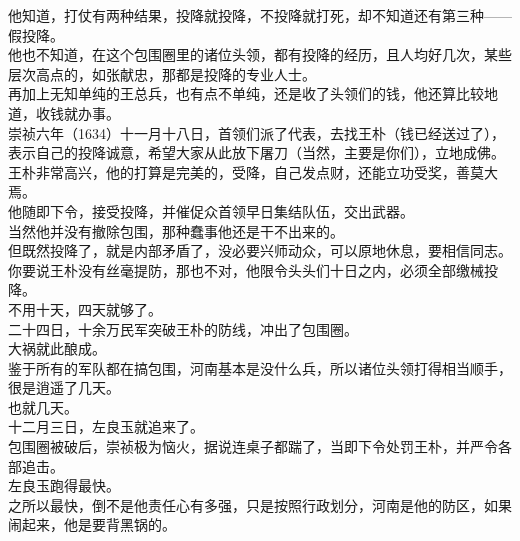 \begin{multicols}{\theparacolNo}
他知道，打仗有两种结果，投降就投降，不投降就打死，却不知道还有第三种——假投降。\\

他也不知道，在这个包围圈里的诸位头领，都有投降的经历，且人均好几次，某些层次高点的，如张献忠，那都是投降的专业人士。\\

再加上无知单纯的王总兵，也有点不单纯，还是收了头领们的钱，他还算比较地道，收钱就办事。\\

崇祯六年（1634）十一月十八日，首领们派了代表，去找王朴（钱已经送过了），表示自己的投降诚意，希望大家从此放下屠刀（当然，主要是你们），立地成佛。\\

王朴非常高兴，他的打算是完美的，受降，自己发点财，还能立功受奖，善莫大焉。\\

他随即下令，接受投降，并催促众首领早日集结队伍，交出武器。\\

当然他并没有撤除包围，那种蠢事他还是干不出来的。\\

但既然投降了，就是内部矛盾了，没必要兴师动众，可以原地休息，要相信同志。\\

你要说王朴没有丝毫提防，那也不对，他限令头头们十日之内，必须全部缴械投降。\\

不用十天，四天就够了。\\

二十四日，十余万民军突破王朴的防线，冲出了包围圈。\\

大祸就此酿成。\\

鉴于所有的军队都在搞包围，河南基本是没什么兵，所以诸位头领打得相当顺手，很是逍遥了几天。\\

也就几天。\\

十二月三日，左良玉就追来了。\\

包围圈被破后，崇祯极为恼火，据说连桌子都踹了，当即下令处罚王朴，并严令各部追击。\\

左良玉跑得最快。\\

之所以最快，倒不是他责任心有多强，只是按照行政划分，河南是他的防区，如果闹起来，他是要背黑锅的。\\


\end{multicols}
